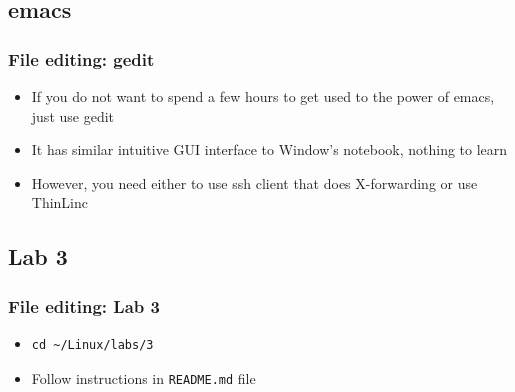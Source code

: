 \documentclass{beamer}
\begin{document}
\subsection{emacs}
\begin{frame}[fragile]
  \frametitle{File editing: gedit}
  \begin{itemize}
  \item If you do not want to spend a few hours to get used to the power of emacs, just use
    {\color{mycolorcli}gedit}
  \item It has similar intuitive GUI interface to Window's notebook, nothing to learn
  \item However, you need either to use ssh client that does X-forwarding or use ThinLinc
  \end{itemize}
\end{frame}


\subsection{Lab 3}
\begin{frame}[fragile]
  \frametitle{File editing: Lab 3}

\begin{itemize}
\item
{\color{mycolorcli}
\begin{verbatim}
cd ~/Linux/labs/3
\end{verbatim}
}
\item Follow instructions in {\color{mycolorcli}\verb|README.md|} file

\end{itemize}
\end{frame}
\end{document}
